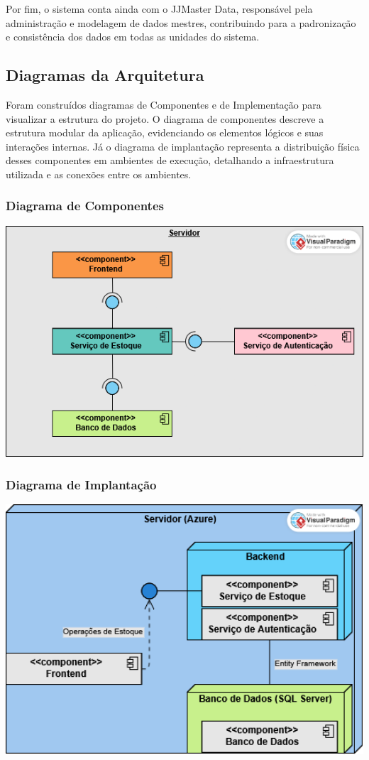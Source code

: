 \documentclass[
	12pt,				%
	openright,			%
	twoside,			%
	a4paper,			%
	english,			%
	french,				%
	spanish,			%
	brazil				%
	]{abntex2}
\begin{document}
Por fim, o sistema conta ainda com o JJMaster Data, responsável pela administração e modelagem de dados mestres, contribuindo para a padronização e consistência dos dados em todas as unidades do sistema.

\subsection{Diagramas da Arquitetura}

Foram construídos diagramas de Componentes e de Implementação para visualizar a estrutura do projeto. O diagrama de componentes descreve a estrutura modular da aplicação, evidenciando os elementos lógicos e suas interações internas. Já o diagrama de implantação representa a distribuição física desses componentes em ambientes de execução, detalhando a infraestrutura utilizada e as conexões entre os ambientes.


\subsubsection{Diagrama de Componentes}


\includegraphics[width=1.0\textwidth]{Figuras/Componentes.png}


\subsubsection{Diagrama de Implantação}


\includegraphics[width=1.0\textwidth]{Figuras/Implantação.png}
\end{document}
